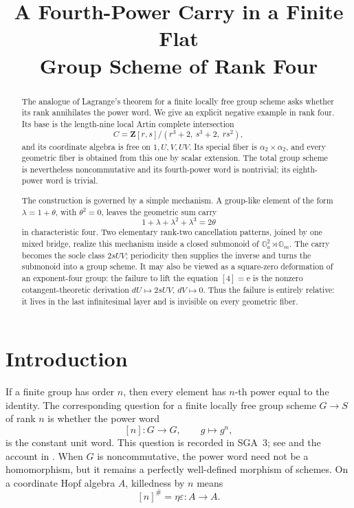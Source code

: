 \documentclass[11pt]{amsart}
\title[A fourth-power carry in rank four]
      {A Fourth-Power Carry in a Finite Flat\\
       Group Scheme of Rank Four}
\author{}
\date{}
\theoremstyle{definition}
\theoremstyle{remark}
\newcommand{\Z}{\mathbf Z}
\newcommand{\Ga}{\mathbb G_a}
\newcommand{\Gm}{\mathbb G_m}
\newcommand{\eps}{\varepsilon}
\newcommand{\unit}{\mathrm e}
\begin{document}
\begin{abstract}
The analogue of Lagrange's theorem for a finite locally free group scheme
asks whether its rank annihilates the power word.  We give an explicit
negative example in rank four.  Its base is the length-nine local Artin
complete intersection
\[
 C=\Z[r,s]/(r^3+2,\ s^3+2,\ rs^2),
\]
and its coordinate algebra is free on \(1,U,V,UV\).  Its special fiber is
\(\alpha _2\times\alpha _2\), and every geometric fiber is obtained from
this one by scalar extension.  The total group scheme is nevertheless
noncommutative and its fourth-power word is nontrivial; its eighth-power
word is trivial.

The construction is governed by a simple mechanism.  A group-like element
of the form \(\lambda=1+\theta\), with \(\theta^2=0\), leaves the geometric
sum carry
\[
 1+\lambda+\lambda^2+\lambda^3=2\theta
\]
in characteristic four.  Two elementary rank-two cancellation patterns,
joined by one mixed bridge, realize this mechanism inside a closed
submonoid of \(\Ga^2\rtimes\Gm\).  The carry becomes the socle class
\(2sUV\); periodicity then supplies the inverse and turns the submonoid into
a group scheme.  It may also be viewed as a square-zero deformation of an
exponent-four group: the failure to lift the equation \([4]=\unit\) is the
nonzero cotangent-theoretic derivation \(dU\mapsto2sUV\), \(dV\mapsto0\).
Thus the failure is entirely relative: it lives in the last infinitesimal
layer and is invisible on every geometric fiber.
\end{abstract}

\maketitle

\section{Introduction}

If a finite group has order \(n\), then every element has \(n\)-th power
equal to the identity.  The corresponding question for a finite locally
free group scheme \(G\to S\) of rank \(n\) is whether the power word
\[
 [n]\colon G\longrightarrow G,\qquad g\longmapsto g^n,
\]
is the constant unit word.  This question is recorded in SGA~3; see
\cite[Exp.~VIII, Rem.~7.3.1]{SGA3II} and the account in
\cite{SchoofSurvey}.  When \(G\) is noncommutative, the power word need not
be a homomorphism, but it remains a perfectly well-defined morphism of
schemes.  On a coordinate Hopf algebra \(A\), killedness by \(n\) means
\[
 [n]^\#=\eta\eps\colon A\longrightarrow A.
\]
\end{document}
